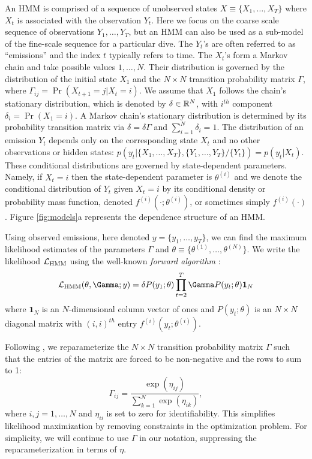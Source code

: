 An HMM is comprised of a sequence of unobserved states $X \equiv \big\{X_1, \ldots, X_T\big\}$ where $X_t$ is associated with the observation $Y_t$. Here we focus on the coarse scale sequence of observations $Y_1,\ldots, Y_T$, but an HMM can also be used as a sub-model of the fine-scale sequence for a particular dive. The $Y_t$'s are often referred to as ``emissions'' and the index $t$ typically refers to time. 
The $X_t$'s form a Markov chain and take possible values $1, \ldots, N$. Their distribution is governed by the distribution of the initial state $X_1$ and the $N \times N$ transition probability matrix $\Gamma$, where $\Gamma_{ij} = \Pr(X_{t+1} = j | X_t = i)$. 
%
We assume that $X_1$ follows the chain's stationary distribution, which is denoted by $\delta \in \mathbb{R}^N$, with $i^{th}$ component
$\delta_i = \Pr(X_1 = i).$
A Markov chain's stationary distribution is determined by its probability transition matrix via $\delta = \delta \Gamma$ and $\sum_{i=1}^N \delta_i = 1$.
%
The distribution of an emission $Y_t$ depends only on the corresponding state $X_t$ and no other observations or hidden states: $p\left(y_t|\{X_1,\ldots, X_T\},\{Y_1,\ldots, Y_T\}/ \{Y_t\}\right) = p(y_t|X_t)$.
%
These conditional distributions are governed by state-dependent parameters. Namely, if $X_t = i$ then the state-dependent parameter is $\theta^{(i)}$ and we denote the conditional distribution of $Y_t$ given $X_t=i$ by its conditional density or probability mass function, denoted $f^{(i)}(\cdot ; \theta^{(i)})$, or sometimes simply $f^{(i)}(\cdot)$.
%
Figure \ref{fig:models}a represents the dependence structure of an HMM.

Using observed emissions, here denoted $y = \{y_1,\ldots,y_T\}$, we can find the maximum likelihood estimates of the parameters $\Gamma$ and $\theta \equiv \{\theta^{(1)},\ldots,\theta^{(N)}\}$. We write the likelihood $\mathcal{L}_{\text{HMM}}$ using the  well-known \textit{forward algorithm} \citep{Zucchini:2016}:
%
$$\calL_{\text{HMM}}(\theta,\Gamma;y) = \delta P(y_1;\theta) \prod_{t=2}^T \Gamma P(y_t;\theta) \mathbf{1}_N$$
%
where $\mathbf{1}_N$ is an $N$-dimensional column vector of ones and
%
$P(y_t;\theta)$ is an $N \times N$ diagonal matrix with $(i,i)^{th}$ entry  $f^{(i)}(y_t; \theta^{(i)})$.
%

Following \citet{Barajas:2017}, we reparameterize the $N \times N$ transition probability matrix $\Gamma$ such that the entries of the matrix are forced to be non-negative and the rows to sum to 1:
%
\[
\Gamma_{ij} = \frac{\exp(\eta_{ij})}{\sum_{k=1}^N \exp(\eta_{ik})}, 
\]
%
where $i,j = 1,\ldots,N$ and $\eta_{ii}$ is set to zero for identifiability. This simplifies likelihood maximization by removing constraints in the optimization problem. For simplicity, we will continue to use $\Gamma$ in our notation, suppressing the reparameterization in terms of $\eta$.

